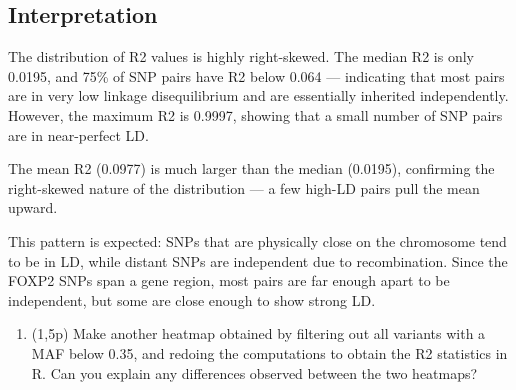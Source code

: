 \documentclass[
]{article}
\newenvironment{Shaded}{\begin{snugshade}}{\end{snugshade}}
\newcommand{\CommentTok}[1]{\textcolor[rgb]{0.56,0.35,0.01}{\textit{#1}}}
\newcommand{\ControlFlowTok}[1]{\textcolor[rgb]{0.13,0.29,0.53}{\textbf{#1}}}
\newcommand{\FunctionTok}[1]{\textcolor[rgb]{0.13,0.29,0.53}{\textbf{#1}}}
\newcommand{\NormalTok}[1]{#1}
\newcommand{\OtherTok}[1]{\textcolor[rgb]{0.56,0.35,0.01}{#1}}
\newcommand{\SpecialCharTok}[1]{\textcolor[rgb]{0.81,0.36,0.00}{\textbf{#1}}}
\newcommand{\StringTok}[1]{\textcolor[rgb]{0.31,0.60,0.02}{#1}}
\providecommand{\tightlist}{%
  \setlength{\itemsep}{0pt}\setlength{\parskip}{0pt}}
\begin{document}
\subsection{Interpretation}\label{interpretation-2}

The distribution of R2 values is highly right-skewed. The median R2 is
only 0.0195, and 75\% of SNP pairs have R2 below 0.064 --- indicating
that most pairs are in very low linkage disequilibrium and are
essentially inherited independently. However, the maximum R2 is 0.9997,
showing that a small number of SNP pairs are in near-perfect LD.

The mean R2 (0.0977) is much larger than the median (0.0195), confirming
the right-skewed nature of the distribution --- a few high-LD pairs pull
the mean upward.

This pattern is expected: SNPs that are physically close on the
chromosome tend to be in LD, while distant SNPs are independent due to
recombination. Since the FOXP2 SNPs span a gene region, most pairs are
far enough apart to be independent, but some are close enough to show
strong LD.

\begin{enumerate}
\def\labelenumi{\arabic{enumi}.}
\setcounter{enumi}{5}
\tightlist
\item
  (1,5p) Make another heatmap obtained by filtering out all variants
  with a MAF below 0.35, and redoing the computations to obtain the R2
  statistics in R. Can you explain any differences observed between the
  two heatmaps?
\end{enumerate}

\begin{Shaded}
\end{Shaded}
\end{document}
